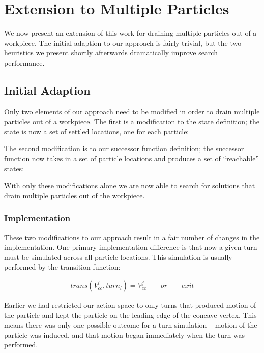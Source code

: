 \chapter{Extension to Multiple Particles}

We now present an extension of this work for draining multiple particles out of a workpiece. The initial adaption to our approach is fairly trivial, but the two heuristics we present shortly afterwards dramatically improve search performance.

\section{Initial Adaption}

Only two elements of our approach need to be modified in order to drain multiple particles out of a workpiece. The first is a modification to the state definition; the state is now a set of settled locations, one for each particle:

 {
  \label{eq:multipleParticleState}
}

The second modification is to our successor function definition; the successor function now takes in a set of particle locations and produces a set of ``reachable'' states:

 {
  \label{eq:successorMultipleParticle}
}

With only these modifications alone we are now able to search for solutions that drain multiple particles out of the workpiece.

\subsection{Implementation}

These two modifications to our approach result in a fair number of changes in the implementation. One primary implementation difference is that now a given turn must be simulated across all particle locations. This simulation is usually performed by the transition function:

$$
trans(V_{cc}^{i}, turn_{l}) = V_{cc}^j \qquad or \qquad exit
$$

Earlier we had restricted our action space to only turns that produced motion of the particle and kept the particle on the leading edge of the concave vertex. This means there was only one possible outcome for a turn simulation -- motion of the particle was induced, and that motion began immediately when the turn was performed.

